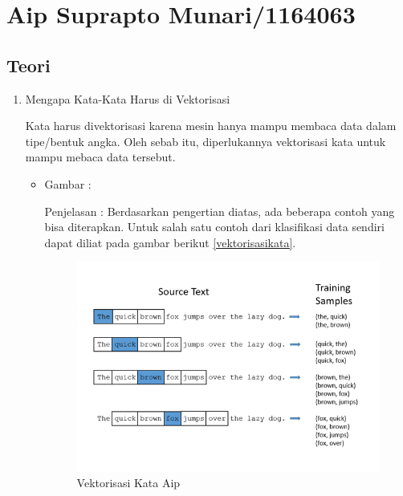 \section{Aip Suprapto Munari/1164063}
\subsection{Teori}
\begin{enumerate}

\item Mengapa Kata-Kata Harus di Vektorisasi
\par Kata harus divektorisasi karena mesin hanya mampu membaca data dalam tipe/bentuk angka. Oleh sebab itu, diperlukannya vektorisasi kata untuk mampu mebaca data tersebut. 
\par
\begin{itemize}
\item Gambar :
\par Penjelasan : Berdasarkan pengertian diatas, ada beberapa contoh yang bisa diterapkan. Untuk salah satu contoh dari klasifikasi data sendiri dapat diliat pada gambar berikut \ref{vektorisasikata}.
\begin{figure}[ht]
\centering
\includegraphics[scale=0.6]{figures/AIP/d1.PNG}
\caption{Vektorisasi Kata Aip}
\label{text-Aip}
\end{figure}
\end{itemize}


\end{enumerate}
